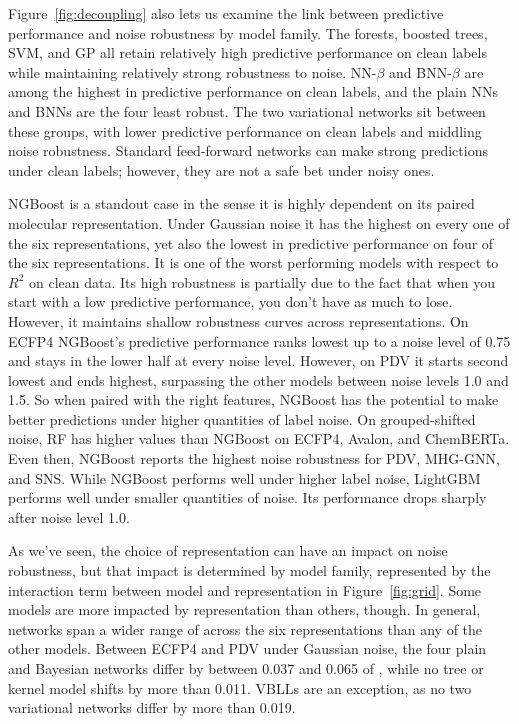 Figure~\ref{fig:decoupling} also lets us examine the link between predictive performance and noise robustness by model family. The forests, boosted trees, SVM, and GP all retain relatively high predictive performance on clean labels while maintaining relatively strong robustness to noise. NN-$\beta$ and BNN-$\beta$ are among the highest in predictive performance on clean labels, and the plain NNs and BNNs are the four least robust. The two variational networks sit between these groups, with lower predictive performance on clean labels and middling noise robustness. Standard feed-forward networks can make strong predictions under clean labels; however, they are not a safe bet under noisy ones.

NGBoost is a standout case in the sense it is highly dependent on its paired molecular representation. Under Gaussian noise it has the highest \aucnorm{} on every one of the six representations, yet also the lowest in predictive performance on four of the six representations. It is one of the worst performing models with respect to $R^2$ on clean data. Its high robustness is partially due to the fact that when you start with a low predictive performance, you don't have as much to lose. However, it maintains shallow robustness curves across representations. On ECFP4 NGBoost's predictive performance ranks lowest up to a noise level of 0.75 and stays in the lower half at every noise level. However, on PDV it starts second lowest and ends highest, surpassing the other models between noise levels 1.0 and 1.5. So when paired with the right features, NGBoost has the potential to make better predictions under higher quantities of label noise. On grouped-shifted noise, RF has higher \aucnorm{} values than NGBoost on ECFP4, Avalon, and ChemBERTa. Even then, NGBoost reports the highest noise robustness for PDV, MHG-GNN, and SNS. While NGBoost performs well under higher label noise, LightGBM performs well under smaller quantities of noise. Its performance drops sharply after noise level 1.0.

As we've seen, the choice of representation can have an impact on noise robustness, but that impact is determined by model family, represented by the interaction term between model and representation in Figure~\ref{fig:grid}. Some models are more impacted by representation than others, though. In general, networks span a wider range of \aucnorm{} across the six representations than any of the other models. Between ECFP4 and PDV under Gaussian noise, the four plain and Bayesian networks differ by between 0.037 and 0.065 of \aucnorm, while no tree or kernel model shifts by more than 0.011. VBLLs are an exception, as no two variational networks differ by more than 0.019.

